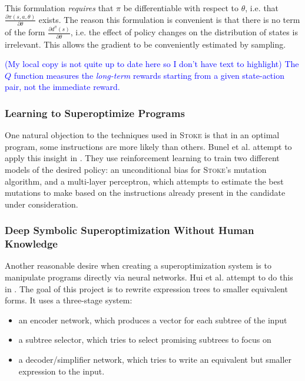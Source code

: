 \documentclass[12pt,twoside]{reedthesis}
\newcommand{\comment}[2]{\textbf{#1} \textcolor{blue}{#2}}
\begin{document}
This formulation \textit{requires} that $\pi$ be differentiable with respect to $\theta$, i.e. that $\frac{\partial \pi(s,a, \theta)}{\partial \theta}$ exists.
The reason this formulation is convenient is that there is no term of the form $\frac{\partial d^\pi(s)}{\partial \theta}$, i.e. the effect of policy changes on the distribution of states is irrelevant.
This allows the gradient to be conveniently estimated by sampling.  %

\comment{}{(My local copy is not quite up to date here so I don't have text to highlight) The $Q$ function measures the \emph{long-term} rewards starting from a given state-action pair, not the immediate reward.}

\subsubsection{Learning to Superoptimize Programs}
One natural objection to the techniques used in \textsc{Stoke} is that in an optimal program, some instructions are more likely than others.
Bunel et al. attempt to apply this insight in \cite{bunel2017learning}.
They use reinforcement learning to train two different models of the desired policy:
    an unconditional bias for \textsc{Stoke}'s mutation algorithm,
    and a multi-layer perceptron\footnotemark,
        which attempts to estimate the best mutations to make based on the instructions already present in the candidate under consideration.
    

\subsubsection{Deep Symbolic Superoptimization Without Human Knowledge}
Another reasonable desire when creating a superoptimization system is to manipulate programs directly via neural networks.
Hui et al. attempt to do this in \cite{hui2020deep}. 
The goal of this project is to rewrite expression trees to smaller equivalent forms. 
It uses a three-stage system:
\begin{itemize}
    \item an encoder network\footnotemark, which produces a vector for each subtree of the input
    \item a subtree selector, which tries to select promising subtrees to focus on
    \item a decoder/simplifier network, which tries to write an equivalent but smaller expression to the input.
\end{itemize}
    
\end{document}
